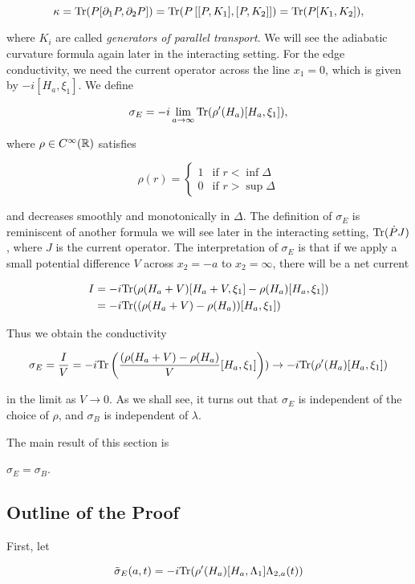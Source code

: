 \documentclass[12pt, letterpaper]{article}
\begin{document}
\[\kappa = \text{Tr}(P[\partial_1P,\partial_2 P]) = \text{Tr}(P\left[ [P,K_1], [P,K_2] \right]) = \text{Tr}(P[K_1,K_2]),\]

where $K_i$ are called \textit{generators of parallel transport}. We will see the adiabatic curvature formula again later in the interacting setting. For the edge conductivity, we need the current operator across the line $x_1=0$, which is given by $-i[H_a,\xi_1]$. We define 

\[\sigma_E = -i\lim_{a\to\infty}\text{Tr}(\rho'(H_a)[H_a,\xi_1]),\]

where $\rho \in C^\infty(\mathbb{R})$ satisfies

\[\rho(r) = \begin{cases} 1 & \text{if } r<\inf\Delta\\ 0 & \text{if } r>\sup\Delta\end{cases}\]

and decreases smoothly and monotonically in $\Delta$. The definition of $\sigma_E$ is reminiscent of another formula we will see later in the interacting setting, $\text{Tr}(\dot{P}J)$, where $J$ is the current operator. The interpretation of $\sigma_E$ is that if we apply a small potential difference $V$ across $x_2=-a$ to $x_2=\infty$, there will be a net current

\[\begin{aligned}
I &= -i\text{Tr}(\rho(H_a+V)[H_a+V,\xi_1] - \rho(H_a)[H_a,\xi_1])\\
&= -i\text{Tr}((\rho(H_a+V)-\rho(H_a))[H_a,\xi_1])
\end{aligned}\]

Thus we obtain the conductivity

\[\sigma_E = \frac{I}{V} = -i\text{Tr}\left(\frac{(\rho(H_a+V)-\rho(H_a)}{V}[H_a,\xi_1]\right)) \to -i\text{Tr}(\rho'(H_a)[H_a,\xi_1])\]

in the limit as $V\to0$. As we shall see, it turns out that $\sigma_E$ is independent of the choice of $\rho$, and $\sigma_B$ is independent of $\lambda$. 

The main result of this section is

\begin{theorem}
$\sigma_E=\sigma_B$.
\end{theorem}

\subsection{Outline of the Proof}

First, let 

\[\tilde{\sigma}_E(a,t) = -i\text{Tr}(\rho'(H_a)[H_a,\Lambda_1]\Lambda_{2,a}(t))\]
\end{document}
